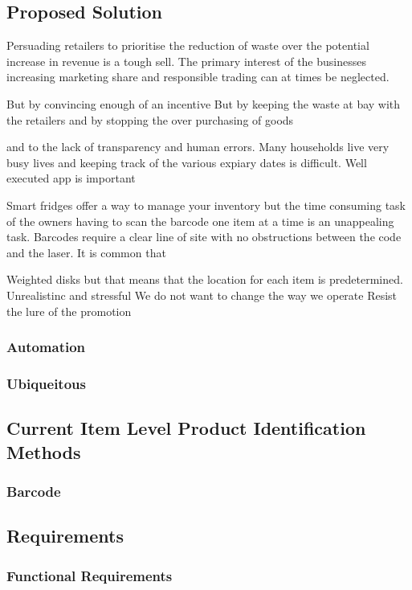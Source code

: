 \documentclass[a4paper, 11pt]{article}
\begin{document}
\subsection{Proposed Solution}

Persuading retailers to prioritise the reduction of waste over the potential increase in revenue is a tough sell. The primary interest of the businesses increasing marketing share and responsible trading can at times be neglected. 

But by convincing enough of an incentive But by keeping the waste at bay with the retailers and by stopping the over purchasing of goods 

and to the lack of transparency  and human errors. Many households live very busy lives and keeping track of the various expiary dates is difficult. 
Well executed app is important

Smart fridges offer a way to manage your inventory but the time consuming task of the owners having to scan the barcode one item at a time is an unappealing task. Barcodes require a clear line of site with no obstructions between the code and the laser. It is common that 

Weighted disks but that means that the location for each item is predetermined. Unrealistinc and stressful
We do not want to change the way we operate 
Resist the lure of the promotion

\subsubsection{Automation}
\subsubsection{Ubiqueitous}

\subsection{Current Item Level Product Identification Methods}
\subsubsection{Barcode}

\subsection{Requirements}
\subsubsection{Functional Requirements}
\end{document}
